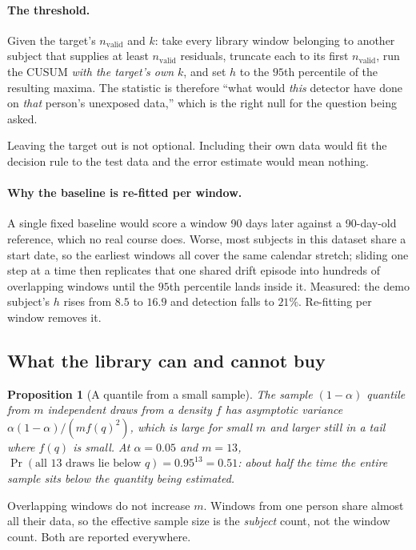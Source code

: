 \documentclass{article}
\theoremstyle{plain}
\newtheorem{proposition}[theorem]{Proposition}
\theoremstyle{definition}
\theoremstyle{remark}
\numberwithin{equation}{section}
\begin{document}
\paragraph{The threshold.} Given the target's $n_{\mathrm{valid}}$ and $k$:
take every library window belonging to another subject that supplies at least
$n_{\mathrm{valid}}$ residuals, truncate each to its first $n_{\mathrm{valid}}$,
run the CUSUM \emph{with the target's own $k$}, and set $h$ to the $95$th
percentile of the resulting maxima. The statistic is therefore ``what would
\emph{this} detector have done on \emph{that} person's unexposed data,'' which
is the right null for the question being asked.

Leaving the target out is not optional. Including their own data would fit the
decision rule to the test data and the error estimate would mean nothing.

\paragraph{Why the baseline is re-fitted per window.} A single fixed baseline
would score a window 90 days later against a 90-day-old reference, which no
real course does. Worse, most subjects in this dataset share a start date, so
the earliest windows all cover the same calendar stretch; sliding one step at a
time then replicates that one shared drift episode into hundreds of
overlapping windows until the $95$th percentile lands inside it. Measured: the
demo subject's $h$ rises from $8.5$ to $16.9$ and detection falls to $21\%$.
Re-fitting per window removes it.

\subsection{What the library can and cannot buy}
\label{sec:quantile}

\begin{proposition}[A quantile from a small sample]
\label{prop:smallq}
The sample $(1-\alpha)$ quantile from $m$ independent draws from a density $f$
has asymptotic variance $\alpha(1-\alpha)/(m f(q)^2)$, which is large for small
$m$ and larger still in a tail where $f(q)$ is small. At $\alpha = 0.05$ and
$m = 13$, $\Pr(\text{all 13 draws lie below } q) = 0.95^{13} = 0.51$: about
half the time the entire sample sits below the quantity being estimated.
\end{proposition}

Overlapping windows do not increase $m$. Windows from one person share almost
all their data, so the effective sample size is the \emph{subject} count, not
the window count. Both are reported everywhere.
\end{document}
